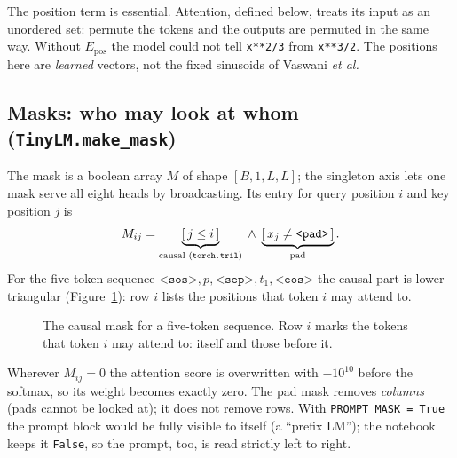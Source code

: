 \documentclass[11pt]{article}
\newcommand{\tok}[1]{\texttt{<#1>}}
\newcommand{\code}[1]{\texttt{#1}}
\newcommand{\Epos}{E_{\text{pos}}}
\begin{document}
The position term is essential. Attention, defined below, treats its input as an
unordered set: permute the tokens and the outputs are permuted in the same way.
Without $\Epos$ the model could not tell \code{x**2/3} from \code{x**3/2}. The
positions here are \emph{learned} vectors, not the fixed sinusoids of Vaswani
\emph{et al.}

\subsection{Masks: who may look at whom (\code{TinyLM.make\_mask})}
\label{sec:mask}

The mask is a boolean array $M$ of shape $[B,1,L,L]$; the singleton axis lets one
mask serve all eight heads by broadcasting. Its entry for query position $i$ and key
position $j$ is
\begin{equation}
  M_{ij} = \underbrace{[\,j\le i\,]}_{\text{causal (\code{torch.tril})}}
     \;\wedge\; \underbrace{[\,x_j\neq\tok{pad}\,]}_{\text{pad}} .
\end{equation}
For the five-token sequence $\tok{sos},p,\tok{sep},t_1,\tok{eos}$ the causal part is
lower triangular (Figure~\ref{fig:mask}): row $i$ lists the positions that token $i$
may attend to.

\begin{figure}[h]
\centering
{}
\caption{The causal mask for a five-token sequence. Row $i$ marks the tokens that
  token $i$ may attend to: itself and those before it.}
\label{fig:mask}
\end{figure}

Wherever $M_{ij}=0$ the attention score is overwritten with $-10^{10}$ before the
softmax, so its weight becomes exactly zero. The pad mask removes \emph{columns}
(pads cannot be looked at); it does not remove rows. With \code{PROMPT\_MASK = True}
the prompt block would be fully visible to itself (a ``prefix LM''); the notebook
keeps it \code{False}, so the prompt, too, is read strictly left to right.
\end{document}
